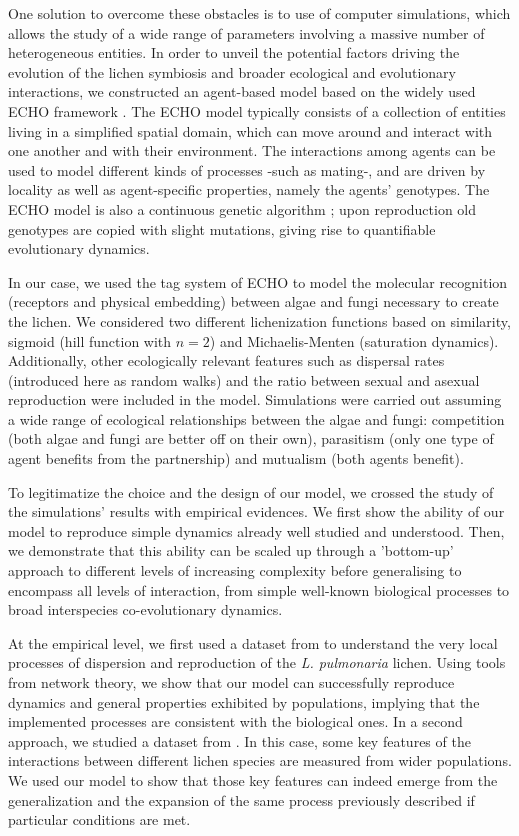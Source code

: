 \documentclass[runningheads,a4paper]{llncs}
\begin{document}
One solution to overcome these obstacles is to use of computer simulations, which allows the study of a wide range of parameters involving a massive number of heterogeneous entities. 
In order to unveil the potential factors driving the evolution of the lichen symbiosis and broader ecological and evolutionary interactions, we constructed an agent-based model based on the widely used ECHO framework \cite{holland1999echoing,holland1995hidden}. The ECHO model typically consists of a collection of entities living in a simplified spatial domain, which can move around and interact with one another and with their environment. The interactions among agents can be used to model different kinds of processes -such as mating-, and are driven by locality as well as agent-specific properties, namely the agents' genotypes. The ECHO model is also a continuous genetic algorithm \cite{mitchell1998introduction}; upon reproduction old genotypes are copied with slight mutations, giving rise to quantifiable evolutionary dynamics.

In our case, we used the tag system of ECHO to model the molecular recognition (receptors and physical embedding) between algae and fungi necessary to create the lichen. We considered two different lichenization functions based on similarity, sigmoid (hill function with $n=2$) and Michaelis-Menten (saturation dynamics). Additionally, other ecologically relevant features such as dispersal rates (introduced here as random walks) and the ratio between sexual and asexual reproduction were included in the model. Simulations were carried out assuming a wide range of ecological relationships between the algae and fungi: competition (both algae and fungi are better off on their own), parasitism (only one type of agent benefits from the partnership) and mutualism (both agents benefit).

To legitimatize the choice and the design of our model, we crossed the study of the simulations' results with empirical evidences. We first show the ability of our model to reproduce simple dynamics already well studied and understood. Then, we demonstrate that this ability can be scaled up through a 'bottom-up' approach to different levels of increasing complexity before generalising to encompass all levels of interaction, from simple well-known biological processes to broad interspecies co-evolutionary dynamics.

At the empirical level, we first used a dataset from \cite{dal2012vertical} to understand the very local processes of dispersion and reproduction of the {\em L. pulmonaria} lichen.
Using tools from network theory, we show that our model can successfully reproduce dynamics and general properties exhibited by populations, implying that the implemented processes are consistent with the biological ones. In a second approach, we studied a dataset from \cite{dal2014molecular}. In this case, some key features of the interactions between different lichen species are measured from wider populations. We used our model to show that those key features can indeed emerge from the generalization and the expansion of the same process previously described if particular conditions are met. 
\end{document}
